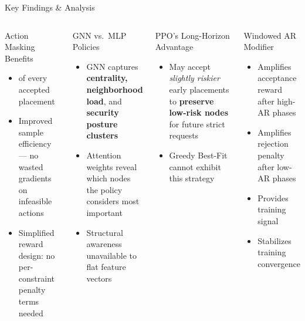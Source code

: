 \begin{frame}{Key Findings \& Analysis}
  \begin{columns}[T]
      \begin{block}{Action Masking Benefits}
        \begin{itemize}
          \item {} of every accepted placement
          \item Improved sample efficiency --- no wasted gradients on infeasible actions
          \item Simplified reward design: no per-constraint penalty terms needed
        \end{itemize}
      \end{block}
      \vspace{4pt}
      \begin{block}{GNN vs.\ MLP Policies}
        \begin{itemize}
          \item GNN captures \textbf{centrality, neighborhood load}, and \textbf{security posture clusters}
          \item Attention weights reveal which nodes the policy considers most important
          \item Structural awareness unavailable to flat feature vectors
        \end{itemize}
      \end{block}
      \begin{block}{PPO's Long-Horizon Advantage}
        \begin{itemize}
          \item May accept \emph{slightly riskier} early placements to \textbf{preserve low-risk nodes} for future strict requests
          \item Greedy Best-Fit cannot exhibit this strategy
        \end{itemize}
      \end{block}
      \vspace{4pt}
      \begin{block}{Windowed AR Modifier}
        \begin{itemize}
          \item Amplifies acceptance reward after high-AR phases
          \item Amplifies rejection penalty after low-AR phases
          \item Provides  training signal
          \item Stabilizes training convergence
        \end{itemize}
      \end{block}
  \end{columns}
\end{frame}
